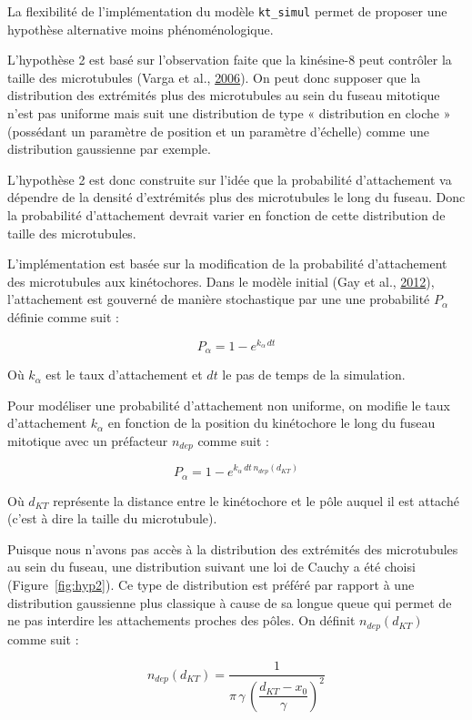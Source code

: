 \documentclass[12pt,a4paper,twoside,openright]{book}
\begin{document}
La flexibilité de l'implémentation du modèle \texttt{kt\_simul} permet
de proposer une hypothèse alternative moins phénoménologique.

L'hypothèse 2 est basé sur l'observation faite que la kinésine-8 peut
contrôler la taille des microtubules (Varga et al.,
\hyperref[ref-Varga2006]{2006}). On peut donc supposer que la
distribution des extrémités plus des microtubules au sein du fuseau
mitotique n'est pas uniforme mais suit une distribution de type «
distribution en cloche » (possédant un paramètre de position et un
paramètre d'échelle) comme une distribution gaussienne par exemple.

L'hypothèse 2 est donc construite sur l'idée que la probabilité
d'attachement va dépendre de la densité d'extrémités plus des
microtubules le long du fuseau. Donc la probabilité d'attachement
devrait varier en fonction de cette distribution de taille des
microtubules.

L'implémentation est basée sur la modification de la probabilité
d'attachement des microtubules aux kinétochores. Dans le modèle initial
(Gay et al., \hyperref[ref-Gay2012a]{2012}), l'attachement est gouverné
de manière stochastique par une une probabilité \(P_{\alpha}\) définie
comme suit :

\[
P_{\alpha} = 1 - e^{k_{\alpha}\,dt}
\]

Où \(k_{\alpha}\) est le taux d'attachement et \(dt\) le pas de temps de
la simulation.

Pour modéliser une probabilité d'attachement non uniforme, on modifie le
taux d'attachement \(k_{\alpha}\) en fonction de la position du
kinétochore le long du fuseau mitotique avec un préfacteur \(n_{dep}\)
comme suit :

\[
P_{\alpha} = 1 - e^{k_{\alpha}\,dt\,n_{dep}(d_{KT})}
\]

Où \(d_{KT}\) représente la distance entre le kinétochore et le pôle
auquel il est attaché (c'est à dire la taille du microtubule).

Puisque nous n'avons pas accès à la distribution des extrémités des
microtubules au sein du fuseau, une distribution suivant une loi de
Cauchy a été choisi (Figure~\ref{fig:hyp2}). Ce type de distribution est
préféré par rapport à une distribution gaussienne plus classique à cause
de sa longue queue qui permet de ne pas interdire les attachements
proches des pôles. On définit \(n_{dep}(d_{KT})\) comme suit :

\[
n_{dep}(d_{KT}) = \dfrac{1}{\pi \, \gamma \, (\dfrac{d_{KT} - x_0}{\gamma})^2}
\]
\end{document}
